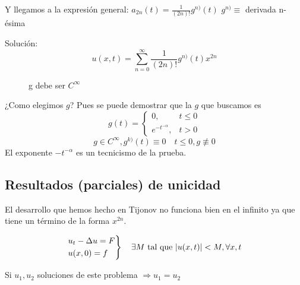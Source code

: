 			Y llegamos a la expresión general: $a_{2n} (t) = \frac{1}{(2n)!} g^{n)} (t)$
			\obs $g^{n)} \equiv$ derivada n-ésima

			Solución:
				\[ u(x,t) = \sum_{n=0}^\infty  \frac{1}{(2n)!} g^{n)} (t) x^{2n}\]

			\newpage %

			\begin{figure}[hbtp]
				\begin{minipage}[t]{0.5\textwidth}
				\end{minipage}
				\begin{minipage}[t]{0.5\textwidth}
				\end{minipage}
				\caption{g debe ser $C^\infty$}
			\end{figure}

			¿Como elegimos $g$? Pues se puede demostrar que la $g$ que buscamos es
			\[ g(t) = \begin{cases}
				0,& t \leq 0 \\
				e^{-t^{-\alpha}},&  t>0
			\end{cases}\]
			\[ g \in C^\infty, g^{k)}(t) \equiv 0 \quad t \leq 0, g \not\equiv 0\]
			\obs El exponente $-t^{-\alpha}$ es un tecnicismo de la prueba.

		\subsection{Resultados (parciales) de unicidad}

			El desarrollo que hemos hecho en Tijonov no funciona bien en el infinito ya que tiene un término de la forma $x^{2n}$.

			\begin{theorem}
				\[ \begin{rcases}
					u_t - \Delta u = F \\
					u(x,0) = f
				\end{rcases} \quad \exists M \text{ tal que } |u(x,t)| < M, \forall x, t \]

				Si $u_1, u_2$ soluciones de este problema $\Rightarrow u_1 = u_2$
			\end{theorem}

